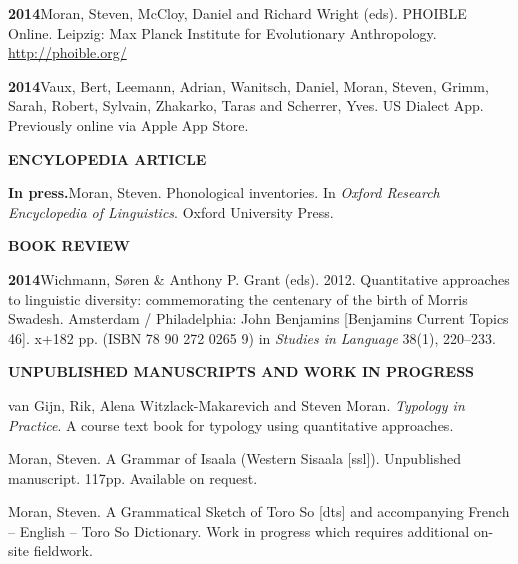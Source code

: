 \documentclass[11pt]{article}
\newcommand{\hangpara}{
 \setlength{\parindent}{0in} %
 \hangindent=0.42in %
}
\begin{document}
\vskip 6pt
\hangpara{\bf 2014}\hspace{1ex}Moran, Steven, McCloy, Daniel and Richard Wright (eds). PHOIBLE Online. Leipzig: Max Planck Institute for Evolutionary Anthropology. \url{http://phoible.org/}

\vskip 6pt
\hangpara{\bf 2014}\hspace{1ex}Vaux, Bert, Leemann, Adrian, Wanitsch, Daniel, Moran, Steven, Grimm, Sarah, Robert, Sylvain, Zhakarko, Taras and Scherrer, Yves. US Dialect App. Previously online via Apple App Store. %


\vskip 20pt
\begin{flushleft}
{\bf ENCYLOPEDIA ARTICLE}
\end{flushleft}

\hangpara
{\bf In press.}\hspace{1ex}Moran, Steven. Phonological inventories. In \textit{Oxford Research Encyclopedia of Linguistics}. Oxford University Press. 


\vskip 20pt
\begin{flushleft}
{\bf BOOK REVIEW}
\end{flushleft}


\hangpara
{\bf 2014}\hspace{1ex}Wichmann, S{\o}ren \& Anthony P. Grant (eds). 2012. Quantitative approaches to linguistic diversity: commemorating the centenary of the birth of Morris Swadesh. Amsterdam / Philadelphia: John Benjamins [Benjamins Current Topics 46]. x+182 pp. (ISBN 78 90 272 0265 9) in \textit{Studies in Language} 38(1), 220--233.

\vskip 20pt
\begin{flushleft}
{\bf UNPUBLISHED MANUSCRIPTS AND WORK IN PROGRESS}
\end{flushleft}

\hangpara
van Gijn, Rik, Alena Witzlack-Makarevich and Steven Moran. {\it Typology in Practice}. A course text book for typology using quantitative approaches.

\vskip 6pt
\hangpara
Moran, Steven. A Grammar of Isaala (Western Sisaala [ssl]). Unpublished manuscript. 117pp. Available on request.

\vskip 6pt
\hangpara
Moran, Steven. A Grammatical Sketch of Toro So [dts] and accompanying French -- English -- Toro So Dictionary. Work in progress which requires additional  on-site fieldwork.
\end{document}
